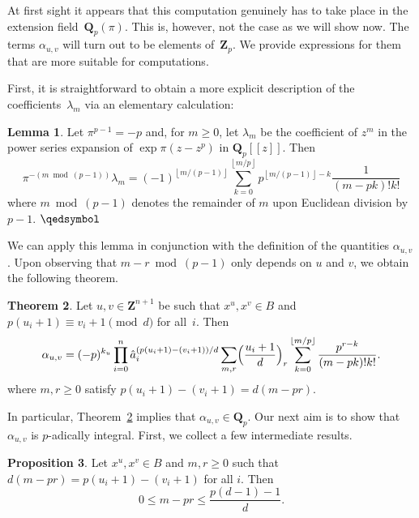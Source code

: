 \documentclass[a4paper,11pt]{article}
\numberwithin{equation}{section}
\providecommand{\floor}[1]{\left\lfloor#1\right\rfloor}   %
\newcommand{\ZZ}{\mathbf{Z}} %
\newcommand{\QQ}{\mathbf{Q}} %
\theoremstyle{definition}
\newtheorem{thm}{Theorem}[section]
\newtheorem{lem}[thm]{Lemma}
\newtheorem{prop}[thm]{Proposition}
\begin{document}
At first sight it appears that this computation genuinely has to 
take place in the extension field~$\QQ_p(\pi)$.  This is, however, 
not the case as we will show now.  The terms $\alpha_{u,v}$ 
will turn out to be elements of~$\ZZ_p$. We provide expressions 
for them that are more suitable for computations.

First, it is straightforward to obtain a more explicit description 
of the coefficients~$\lambda_m$ via an elementary calculation:

\begin{lem} \label{lem:lambdam}
Let $\pi^{p-1} = -p$ and, for $m \geq 0$, let $\lambda_m$ 
be the coefficient of $z^m$ in the power series expansion 
of $\exp \pi (z - z^p)$ in $\QQ_p[[z]]$.  Then 
\begin{equation}
\pi^{- (m \bmod{(p-1)})} \lambda_m = (-1)^{\floor{m/(p-1)}} \sum_{k=0}^{\floor{m/p}} p^{\floor{m/(p-1)} - k} \frac{1}{(m-pk)! k!}
\end{equation}
where $m \bmod{(p-1)}$ denotes the remainder of $m$ upon Euclidean 
division by $p-1$. \hfill $\qedsymbol$
\end{lem}

We can apply this lemma in conjunction with the definition 
of the quantities $\alpha_{u, v}$.  Upon observing that 
$m - r \bmod{(p-1)}$ only depends on $u$ and $v$, we obtain 
the following theorem.

\begin{thm} \label{thm:alpha}
Let $u, v \in \ZZ^{n+1}$ be such that 
$x^u, x^v \in B$ and 
$p (u_i + 1) \equiv v_i + 1 \pmod{d}$ for all~$i$. 
Then 
\begin{equation}
\alpha_{u,v} = (-p)^{k_u} \prod_{i=0}^n 
    \hat{a}_i^{(p (u_i + 1) - (v_i + 1))/d} \sum_{m,r} 
    \Bigl(\frac{u_i+1}{d}\Bigr)_r 
    \sum_{k=0}^{\floor{m/p}} \frac{p^{r-k}}{(m-pk)! k!}.
\end{equation}
where $m, r \geq 0$ satisfy $p (u_i + 1) - (v_i + 1) = d (m - pr)$.
\hfill \qedsymbol
\end{thm}

In particular, Theorem~\ref{thm:alpha} implies that 
$\alpha_{u, v} \in \QQ_p$.  Our next aim is to show
that $\alpha_{u,v}$ is $p$-adically integral.  First, we collect a few 
intermediate results.

\begin{prop} \label{prop:mpr1}
Let $x^u, x^v \in B$ and 
$m, r \geq 0$ such that $d(m-pr) = p(u_i + 1) - (v_i + 1)$ for all $i$.  Then 
\begin{equation}
0 \leq m - p r \leq \frac{p(d-1)-1}{d}.
\end{equation}

\end{prop}
\end{document}
